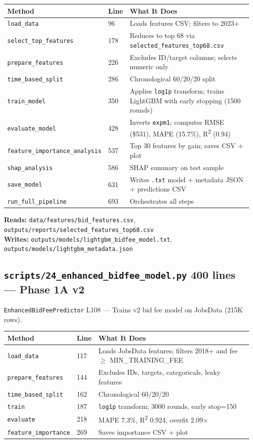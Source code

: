 \documentclass[11pt,a4paper]{article}
\newcommand{\file}[1]{\texttt{\color{gssblue!70!black}#1}}
\newcommand{\func}[1]{\texttt{\color{gssgreen!80!black}#1}}
\newcommand{\cls}[1]{\texttt{\color{uipurple}#1}}
\newcommand{\lineref}[1]{\textcolor{gssgray}{\small L#1}}
\newcommand{\pipetag}[1]{\colorbox{pipeblue!15}{\small\textcolor{pipeblue}{\textbf{#1}}}}
\begin{document}
\begin{longtable}{l l p{8cm}}
\toprule
\textbf{Method} & \textbf{Line} & \textbf{What It Does} \\
\midrule
\endhead
\func{load\_data} & 96 & Loads features CSV; filters to 2023+ \\
\func{select\_top\_features} & 178 & Reduces to top 68 via \file{selected\_features\_top68.csv} \\
\func{prepare\_features} & 226 & Excludes ID/target columns; selects numeric only \\
\func{time\_based\_split} & 286 & Chronological 60/20/20 split \\
\func{train\_model} & 350 & Applies \texttt{log1p} transform; trains LightGBM with early stopping (1500 rounds) \\
\func{evaluate\_model} & 428 & Inverts \texttt{expm1}; computes RMSE (\$531), MAPE (15.7\%), R\textsuperscript{2} (0.94) \\
\func{feature\_importance\_analysis} & 537 & Top 30 features by gain; saves CSV + plot \\
\func{shap\_analysis} & 586 & SHAP summary on test sample \\
\func{save\_model} & 631 & Writes \texttt{.txt} model + metadata JSON + predictions CSV \\
\func{run\_full\_pipeline} & 693 & Orchestrates all steps \\
\bottomrule
\end{longtable}

\textbf{Reads:} \file{data/features/bid\_features.csv}, \file{outputs/reports/selected\_features\_top68.csv}\\
\textbf{Writes:} \file{outputs/models/lightgbm\_bidfee\_model.txt}, \file{outputs/models/lightgbm\_metadata.json}

\subsection{\file{scripts/24\_enhanced\_bidfee\_model.py} \pipetag{400 lines} --- Phase 1A v2}

\cls{EnhancedBidFeePredictor} \lineref{108} --- Trains v2 bid fee model on JobsData (215K rows).

\begin{longtable}{l l p{8cm}}
\toprule
\textbf{Method} & \textbf{Line} & \textbf{What It Does} \\
\midrule
\endhead
\func{load\_data} & 117 & Loads JobsData features; filters 2018+ and fee $\geq$ MIN\_TRAINING\_FEE \\
\func{prepare\_features} & 144 & Excludes IDs, targets, categoricals, leaky features \\
\func{time\_based\_split} & 162 & Chronological 60/20/20 \\
\func{train} & 187 & \texttt{log1p} transform; 3000 rounds, early stop=150 \\
\func{evaluate} & 218 & MAPE 7.3\%, R\textsuperscript{2} 0.924, overfit 2.09$\times$ \\
\func{feature\_importance} & 269 & Saves importance CSV + plot \\
\bottomrule
\end{longtable}
\end{document}
